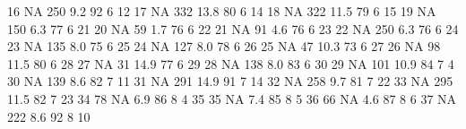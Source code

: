 \documentclass[]{article}
\newenvironment{Shaded}{\begin{snugshade}}{\end{snugshade}}
\newcommand{\DecValTok}[1]{\textcolor[rgb]{0.00,0.00,0.81}{#1}}
\newcommand{\FloatTok}[1]{\textcolor[rgb]{0.00,0.00,0.81}{#1}}
\newcommand{\OtherTok}[1]{\textcolor[rgb]{0.56,0.35,0.01}{#1}}
\begin{document}
\begin{Shaded}
\begin{Highlighting}[]
{\DecValTok{16}    \OtherTok{NA}     \DecValTok{250}  \FloatTok{9.2}   \DecValTok{92}     \DecValTok{6}  \DecValTok{12}
\DecValTok{17}    \OtherTok{NA}     \DecValTok{332} \FloatTok{13.8}   \DecValTok{80}     \DecValTok{6}  \DecValTok{14}
\DecValTok{18}    \OtherTok{NA}     \DecValTok{322} \FloatTok{11.5}   \DecValTok{79}     \DecValTok{6}  \DecValTok{15}
\DecValTok{19}    \OtherTok{NA}     \DecValTok{150}  \FloatTok{6.3}   \DecValTok{77}     \DecValTok{6}  \DecValTok{21}
\DecValTok{20}    \OtherTok{NA}      \DecValTok{59}  \FloatTok{1.7}   \DecValTok{76}     \DecValTok{6}  \DecValTok{22}
\DecValTok{21}    \OtherTok{NA}      \DecValTok{91}  \FloatTok{4.6}   \DecValTok{76}     \DecValTok{6}  \DecValTok{23}
\DecValTok{22}    \OtherTok{NA}     \DecValTok{250}  \FloatTok{6.3}   \DecValTok{76}     \DecValTok{6}  \DecValTok{24}
\DecValTok{23}    \OtherTok{NA}     \DecValTok{135}  \FloatTok{8.0}   \DecValTok{75}     \DecValTok{6}  \DecValTok{25}
\DecValTok{24}    \OtherTok{NA}     \DecValTok{127}  \FloatTok{8.0}   \DecValTok{78}     \DecValTok{6}  \DecValTok{26}
\DecValTok{25}    \OtherTok{NA}      \DecValTok{47} \FloatTok{10.3}   \DecValTok{73}     \DecValTok{6}  \DecValTok{27}
\DecValTok{26}    \OtherTok{NA}      \DecValTok{98} \FloatTok{11.5}   \DecValTok{80}     \DecValTok{6}  \DecValTok{28}
\DecValTok{27}    \OtherTok{NA}      \DecValTok{31} \FloatTok{14.9}   \DecValTok{77}     \DecValTok{6}  \DecValTok{29}
\DecValTok{28}    \OtherTok{NA}     \DecValTok{138}  \FloatTok{8.0}   \DecValTok{83}     \DecValTok{6}  \DecValTok{30}
\DecValTok{29}    \OtherTok{NA}     \DecValTok{101} \FloatTok{10.9}   \DecValTok{84}     \DecValTok{7}   \DecValTok{4}
\DecValTok{30}    \OtherTok{NA}     \DecValTok{139}  \FloatTok{8.6}   \DecValTok{82}     \DecValTok{7}  \DecValTok{11}
\DecValTok{31}    \OtherTok{NA}     \DecValTok{291} \FloatTok{14.9}   \DecValTok{91}     \DecValTok{7}  \DecValTok{14}
\DecValTok{32}    \OtherTok{NA}     \DecValTok{258}  \FloatTok{9.7}   \DecValTok{81}     \DecValTok{7}  \DecValTok{22}
\DecValTok{33}    \OtherTok{NA}     \DecValTok{295} \FloatTok{11.5}   \DecValTok{82}     \DecValTok{7}  \DecValTok{23}
\DecValTok{34}    \DecValTok{78}      \OtherTok{NA}  \FloatTok{6.9}   \DecValTok{86}     \DecValTok{8}   \DecValTok{4}
\DecValTok{35}    \DecValTok{35}      \OtherTok{NA}  \FloatTok{7.4}   \DecValTok{85}     \DecValTok{8}   \DecValTok{5}
\DecValTok{36}    \DecValTok{66}      \OtherTok{NA}  \FloatTok{4.6}   \DecValTok{87}     \DecValTok{8}   \DecValTok{6}
\DecValTok{37}    \OtherTok{NA}     \DecValTok{222}  \FloatTok{8.6}   \DecValTok{92}     \DecValTok{8}  \DecValTok{10}
}
\end{Highlighting}
\end{Shaded}
\end{document}
